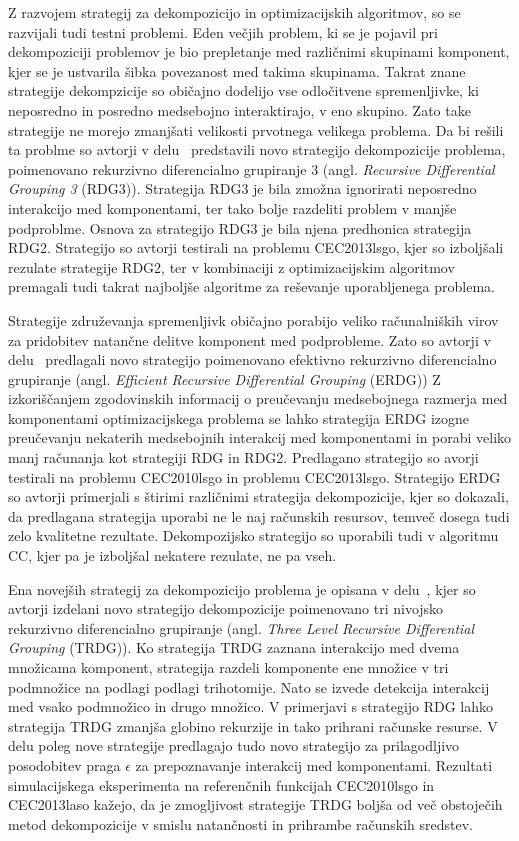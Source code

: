 Z razvojem strategij za dekompozicijo in optimizacijskih algoritmov, so se razvijali tudi testni problemi.
Eden večjih problem, ki se je pojavil pri dekompoziciji problemov je bio prepletanje med različnimi skupinami komponent, kjer se je ustvarila šibka povezanost med takima skupinama.
Takrat znane strategije dekompzicije so običajno dodelijo vse odločitvene spremenljivke, ki neposredno in posredno medsebojno interaktirajo, v eno skupino.
Zato take strategije ne morejo zmanjšati velikosti prvotnega velikega problema.
Da bi rešili ta problme so avtorji v delu~\cite{alg:rdg3} predstavili novo strategijo dekompozicije problema, poimenovano rekurzivno diferencialno grupiranje 3 (angl. \textit{Recursive Differential Grouping 3} (RDG3)).
Strategija RDG3 je bila zmožna ignorirati neposredno interakcijo med komponentami, ter tako bolje razdeliti problem v manjše podproblme.
Osnova za strategijo RDG3 je bila njena predhonica strategija RDG2.
Strategijo so avtorji testirali na problemu CEC2013lsgo, kjer so izboljšali rezulate strategije RDG2, ter v kombinaciji z optimizacijskim algoritmov premagali tudi takrat najboljše algoritme za reševanje uporabljenega problema.

Strategije združevanja spremenljivk običajno porabijo veliko računalniških virov za pridobitev natančne delitve komponent med podprobleme.
Zato so avtorji v delu~\cite{alg:erdg} predlagali novo strategijo poimenovano efektivno rekurzivno diferencialno grupiranje (angl. \textit{Efficient Recursive Differential Grouping} (ERDG))
Z izkoriščanjem zgodovinskih informacij o preučevanju medsebojnega razmerja med komponentami optimizacijskega problema se lahko strategija ERDG izogne preučevanju nekaterih medsebojnih interakcij med komponentami in porabi veliko manj računanja kot strategiji RDG in RDG2.
Predlagano strategijo so avorji testirali na problemu CEC2010lsgo in problemu CEC2013lsgo.
Strategijo ERDG so avtorji primerjali s štirimi različnimi strategija dekompozicije, kjer so dokazali, da predlagana strategija uporabi ne le naj računskih resursov, temveč dosega tudi zelo kvalitetne rezultate.
Dekompozijsko strategijo so uporabili tudi v algoritmu CC, kjer pa je izboljšal nekatere rezulate, ne pa vseh.

Ena novejših strategij za dekompozicijo problema je opisana v delu~\cite{alg:trdg}, kjer so avtorji izdelani novo strategijo dekompozicije poimenovano tri nivojsko rekurzivno diferencialno grupiranje (angl. \textit{Three Level Recursive Differential Grouping} (TRDG)).
Ko strategija TRDG zaznana interakcijo med dvema množicama komponent, strategija razdeli komponente ene množice v tri podmnožice na podlagi podlagi trihotomije.
Nato se izvede detekcija interakcij med vsako podmnožico in drugo množico.
V primerjavi s strategijo RDG lahko strategija TRDG zmanjša globino rekurzije in tako prihrani računske resurse.
V delu poleg nove strategije predlagajo tudo novo strategijo za prilagodljivo posodobitev praga $\epsilon$ za prepoznavanje interakcij med komponentami.
Rezultati simulacijskega eksperimenta na referenčnih funkcijah CEC2010lsgo in CEC2013laso kažejo, da je zmogljivost strategije TRDG boljša od več obstoječih metod dekompozicije v smislu natančnosti in prihrambe računskih sredstev.

